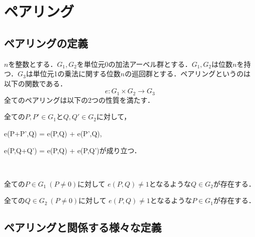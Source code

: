 \chapter{ペアリング}
\par
\section{ペアリングの定義}
\par
$n$を整数とする．$G_1,G_2$を単位元0の加法アーベル群とする．$G_1,G_2$は位数$n$を持つ．$G_3$は単位元1の乗法に関する位数$n$の巡回群とする．ペアリングというのは以下の関数である．
\[
e:G_1\times G_2\longrightarrow G_3
\]
全てのペアリングは以下の2つの性質を満たす．\\
\begin{description}
\item[\textbf{・双線形性}] 
全ての$P,P' \in G_{1}$と$Q,Q' \in G_{2}$に対して，

e(P+P',Q) = e(P,Q) + e(P',Q),

e(P,Q+Q') = e(P,Q) + e(P,Q')が成り立つ．\\

\item[\textbf{・非退縮性}] \hspace{0em}\\\vspace{-2em}

\item 全ての$P \in G_{1} \ (P \not= 0)$に対して $e(P,Q) \not= 1$となるような$Q \in G_{2}$が存在する．
\item 全ての$Q \in G_{2} \ (P \not= 0)$に対して $e(P,Q) \not= 1$となるような$P \in G_{1}$が存在する．

\end{description}

\par
\section{ペアリングと関係する様々な定義}
\par

